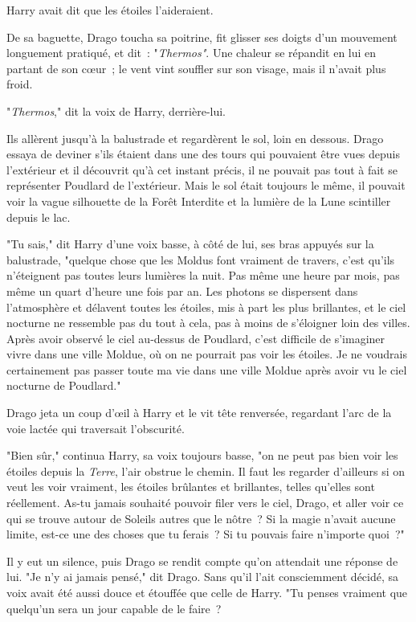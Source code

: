 Harry avait dit que les étoiles l'aideraient.

De sa baguette, Drago toucha sa poitrine, fit glisser ses doigts d'un mouvement longuement pratiqué, et dit~: "\emph{Thermos"}. Une chaleur se répandit en lui en partant de son cœur~; le vent vint souffler sur son visage, mais il n'avait plus froid.

"\emph{Thermos}," dit la voix de Harry, derrière-lui.

Ils allèrent jusqu'à la balustrade et regardèrent le sol, loin en dessous. Drago essaya de deviner s'ils étaient dans une des tours qui pouvaient être vues depuis l'extérieur et il découvrit qu'à cet instant précis, il ne pouvait pas tout à fait se représenter Poudlard de l'extérieur. Mais le sol était toujours le même, il pouvait voir la vague silhouette de la Forêt Interdite et la lumière de la Lune scintiller depuis le lac.

"Tu sais," dit Harry d'une voix basse, à côté de lui, ses bras appuyés sur la balustrade, "quelque chose que les Moldus font vraiment de travers, c'est qu'ils n'éteignent pas toutes leurs lumières la nuit. Pas même une heure par mois, pas même un quart d'heure une fois par an. Les photons se dispersent dans l'atmosphère et délavent toutes les étoiles, mis à part les plus brillantes, et le ciel nocturne ne ressemble pas du tout à cela, pas à moins de s'éloigner loin des villes. Après avoir observé le ciel au-dessus de Poudlard, c'est difficile de s'imaginer vivre dans une ville Moldue, où on ne pourrait pas voir les étoiles. Je ne voudrais certainement pas passer toute ma vie dans une ville Moldue après avoir vu le ciel nocturne de Poudlard."

Drago jeta un coup d'œil à Harry et le vit tête renversée, regardant l'arc de la voie lactée qui traversait l'obscurité.

"Bien sûr," continua Harry, sa voix toujours basse, "on ne peut pas bien voir les étoiles depuis la \emph{Terre}, l'air obstrue le chemin. Il faut les regarder d'ailleurs si on veut les voir vraiment, les étoiles brûlantes et brillantes, telles qu'elles sont réellement. As-tu jamais souhaité pouvoir filer vers le ciel, Drago, et aller voir ce qui se trouve autour de Soleils autres que le nôtre~? Si la magie n'avait aucune limite, est-ce une des choses que tu ferais~? Si tu pouvais faire n'importe quoi~?"

Il y eut un silence, puis Drago se rendit compte qu'on attendait une réponse de lui. "Je n'y ai jamais pensé," dit Drago. Sans qu'il l'ait consciemment décidé, sa voix avait été aussi douce et étouffée que celle de Harry. "Tu penses vraiment que quelqu'un sera un jour capable de le faire~?

